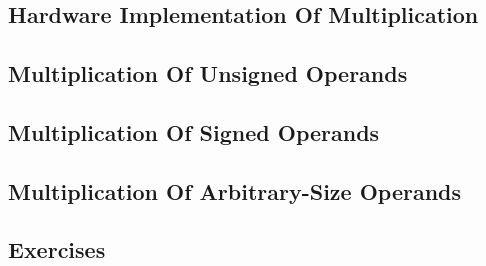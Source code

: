 \chapter{\cmulzerolongtitle{}}

\label{cmul0}

\section{Hardware Implementation Of Multiplication}

\section{Multiplication Of Unsigned Operands}

\section{Multiplication Of Signed Operands}

\section{Multiplication Of Arbitrary-Size Operands}

\section{Exercises}


